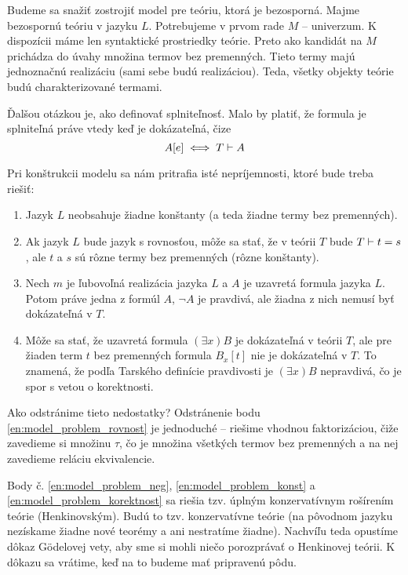 \begin{dokaz}
    Budeme sa snažiť zostrojiť model pre teóriu, ktorá je bezosporná.
    Majme bezospornú teóriu v jazyku $L$. Potrebujeme v prvom rade $M$ --
    univerzum. K dispozícii máme len syntaktické prostriedky teórie.
    Preto ako kandidát na $M$ prichádza do úvahy
    množina termov bez premenných.
    Tieto termy majú jednoznačnú realizáciu (sami sebe budú realizáciou).
    Teda, všetky objekty teórie budú charakterizované termami.

    Ďalšou otázkou je, ako definovať splniteľnosť. Malo by platiť, že
    formula je splniteľná práve vtedy keď je dokázateľná, čize
    \begin{equation*}
    A[e] \iff T \vdash A
    \end{equation*}

    Pri konštrukcii modelu sa nám pritrafia isté nepríjemnosti, ktoré bude 
    treba riešiť:
    \begin{enumerate}
    \item \label{en:model_problem_konst}
        Jazyk $L$ neobsahuje žiadne konštanty (a teda žiadne termy bez
        premenných).

    \item \label{en:model_problem_rovnost}
        Ak jazyk $L$ bude jazyk s rovnosťou, môže sa stať, že v teórii $T$
        bude $T \vdash t=s$, ale $t$ a $s$ sú rôzne termy bez
        premenných (rôzne konštanty).

    \item \label{en:model_problem_neg}
        Nech $m$ je ľubovoľná realizácia jazyka $L$ a $A$ je uzavretá
        formula jazyka $L$. Potom práve jedna z formúl $A$, $\neg A$ je
        pravdivá, ale žiadna z nich nemusí byť dokázateľná v $T$.

    \item \label{en:model_problem_korektnost}
        Môže sa stať, že uzavretá formula $(\exists x)B$ je dokázateľná v teórii
        $T$, ale pre žiaden term $t$ bez premenných formula $B_x[t]$ nie
        je dokázateľná v $T$. To znamená, že
        podľa Tarského definície pravdivosti je $(\exists x)B$
        nepravdivá, čo je spor s vetou o korektnosti.
    \end{enumerate}

    Ako odstránime tieto nedostatky?
    Odstránenie bodu \ref{en:model_problem_rovnost} je jednoduché --
    riešime vhodnou faktorizáciou, čiže zavedieme si množinu $\tau$,
    čo je množina všetkých termov bez premenných
    a na nej zavedieme reláciu ekvivalencie.

    Body č. \ref{en:model_problem_neg}, \ref{en:model_problem_konst} a 
    \ref{en:model_problem_korektnost} sa riešia tzv.
    úplným konzervatívnym rošírením teórie (Henkinovským).
    Budú to tzv.  konzervatívne teórie (na pôvodnom jazyku
    nezískame žiadne nové teorémy a ani nestratíme žiadne).
    Nachvíľu teda opustíme dôkaz G\"odelovej vety, aby sme si mohli niečo
    porozprávať o Henkinovej teórii. K dôkazu sa vrátime, keď na to budeme
    mať pripravenú pôdu.
\end{dokaz}

